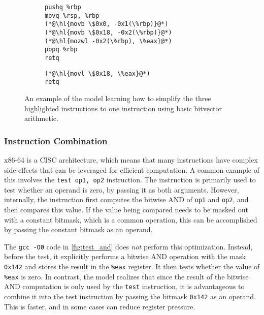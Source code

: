 \documentclass{article}
\begin{document}

\begin{figure}
\begin{subfigure}[t]{\codeboxwidth}
\begin{lstlisting}
pushq %rbp
movq %rsp, %rbp
(*@\hl{movb \$0x0, -0x1(\%rbp)}@*)
(*@\hl{movb \$0x18, -0x2(\%rbp)}@*)
(*@\hl{mozwl -0x2(\%rbp), \%eax}@*)
popq %rbp
retq
\end{lstlisting}
\caption{\ozerocodecaption}
\end{subfigure}
\hfil
\begin{subfigure}[t]{\codeboxwidth}
\begin{lstlisting}
(*@\hl{movl \$0x18, \%eax}@*)
retq
\end{lstlisting}
\caption{\modelcodecaption}
\end{subfigure}
    \centering
    \caption{An example of the model learning how to simplify the three highlighted instructions to one instruction using basic bitvector arithmetic.}
    \label{fig:bitvector}
\end{figure}

\subsubsection{Instruction Combination}

x86-64 is a CISC architecture, which means that many instructions have complex side-effects that can be leveraged for efficient computation.  
%
A common example of this involves the \lstinline{test op1, op2} instruction.  The instruction is primarily used to  test whether an operand is zero, by passing it as both arguments.  However, internally, the instruction first computes the bitwise AND of \lstinline{op1} and \lstinline{op2}, and then compares this value.   %
If the value being compared needs to be masked out with a constant bitmask, which is a common operation, this can be accomplished by passing the constant bitmask as an operand.




The \texttt{gcc -O0} code in \cref{fig:test_and} does \emph{not} perform this optimization.  Instead, before the test, it explicitly performs a bitwise AND operation with the mask \lstinline{0x142} and stores the result in the \lstinline{%eax} register.  It then tests whether the value of \lstinline{%eax} is zero.  In contrast, the model realizes that since the result of the bitwise AND computation is only used by the \lstinline{test} instruction, it is advantageous to combine it into the test instruction by passing the bitmask \lstinline{0x142} as an operand.  This is faster, and in some cases can reduce register pressure.
\end{document}
